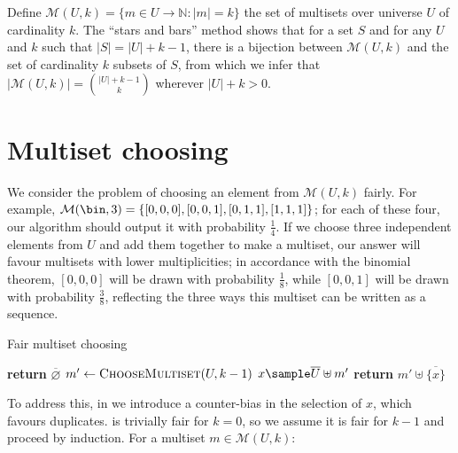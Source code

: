 \documentclass[letterpaper,luatex,11pt]{article}
\begin{document}
Define $\mathcal{M}(U, k) = \{m \in U \rightarrow \mathbb{N}: |m| = k\}$ the set of multisets over
universe \(U\) of cardinality \(k\). The ``stars and bars'' method
shows that for a set \(S\) and for any \(U\) and \(k\) such that \(|S| = |U| + k - 1\), 
there is a bijection between \(\mathcal{M}(U, k)\) and the set of 
cardinality \(k\) subsets of \(S\), from which we infer that 
$|\mathcal{M}(U, k)| = \binom{|U| + k - 1}{k}$ wherever \(|U| + k > 0\).

\section{Multiset choosing}

We consider the problem of choosing an element from $\mathcal{M}(U, k)$ fairly.
For example, $\mathcal{M}(\bin, 3) = \{[0, 0, 0], [0, 0, 1], [0, 1, 1], [1, 1, 1]\}$; for each of
these four, our algorithm should output it with probability $\frac{1}{4}$. If we choose
three independent elements from $U$ and add them together to make a multiset, our answer
will favour multisets with lower multiplicities; in accordance
with the binomial theorem, $[0, 0, 0]$ will be drawn with probability $\frac{1}{8}$, while
$[0, 0, 1]$ will be drawn with probability $\frac{3}{8}$, reflecting the three ways this multiset
can be written as a sequence.



\begin{algorithm}
\caption{Fair multiset choosing}
\begin{algorithmic}[0]
        \State \textbf{return} $\overline{\varnothing}$
    \Else
        \State $m' \leftarrow \textproc{ChooseMultiset}(U, k-1)$
        \State $x \sample \overline{U} \uplus m'$
        \State \textbf{return} $m' \uplus \overline{\{x\}}$
    \EndIf
\EndProcedure
\end{algorithmic}
\end{algorithm}

To address this, in 
we introduce a counter-bias in the selection of $x$, which favours duplicates.
 is trivially fair for $k = 0$, so
we assume it is fair for $k - 1$ and proceed by induction.
For a multiset $m \in \mathcal{M}(U, k)$:
\end{document}
